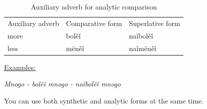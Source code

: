 \begin{table}[!htb]
	\caption{Auxiliary adverb for analytic comparison}
	\begin{tabular}{lll}
		Auxiliary adverb
		& Comparative form
		& Superlative form \\
		more & bolěǐ & naǐbolěǐ \\
		less & mëněǐ & naǐmëněǐ \\
	\end{tabular}
\end{table}

\underline{Examples:}

\textit{Mnogo - bolěǐ mnogo - naǐbolěǐ mnogo}

You can use both synthetic and analytic forms at the same time.

